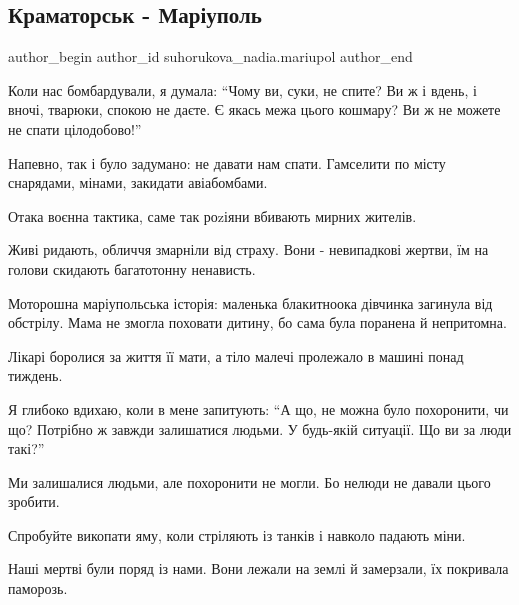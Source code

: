  
 
 
 
 

\subsection{Краматорськ - Маріуполь}
\label{sec:27_06_2023.fb.suhorukova_nadia.mariupol.1.koly_nas_bombarduvaly_kramatorsk_mariupol}

\ifcmt
 author_begin
   author_id suhorukova_nadia.mariupol
 author_end
\fi

Коли нас бомбардували, я думала: \enquote{Чому ви, суки, не спите? Ви ж і вдень, і
вночі, тварюки, спокою не даєте. Є якась межа цього кошмару? Ви ж не можете не
спати цілодобово!}

Напевно, так і було задумано: не давати нам спати. Гамселити по місту
снарядами, мінами, закидати авіабомбами. 

Отака воєнна тактика, саме так роzіяни вбивають мирних жителів.  

Живі  ридають, обличчя змарніли від страху. Вони - невипадкові жертви, їм на
голови скидають багатотонну ненависть. 

Моторошна  маріупольська історія: маленька блакитноока дівчинка загинула від
обстрілу. Мама не змогла поховати дитину, бо сама була поранена й непритомна. 

Лікарі боролися за  життя її мати, а тіло малечі пролежало в машині понад
тиждень.

Я глибоко вдихаю, коли в мене запитують: \enquote{А що, не можна було похоронити, чи
що? Потрібно ж завжди залишатися людьми. У будь-якій ситуації. Що ви за люди
такі?}

Ми залишалися людьми, але похоронити не могли. Бо нелюди не давали цього
зробити.

Спробуйте викопати яму, коли стріляють із танків і навколо падають міни. 

Наші мертві були поряд із нами. Вони лежали на землі й замерзали, їх покривала
паморозь. 


